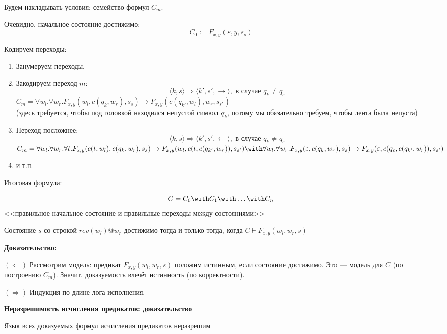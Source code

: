 Будем накладывать условия: семейство формул $C_m$. 

Очевидно, начальное состояние достижимо:
$$C_0 := F_{x,y}(\varepsilon,y,s_s)$$

Кодируем переходы:

\begin{enumerate}
\item Занумеруем переходы.

\item Закодируем переход $m$: $$\langle k, s \rangle \Rightarrow \langle k', s', \rightarrow \rangle, \text{ в случае } q_k \ne q_\varepsilon$$
$C_m = \forall w_l.\forall w_r.F_{x,y}(w_l,c(q_k,w_r),s_s) \rightarrow F_{x,y}(c(q_{k'},w_l),w_r,s_{s'})$\\
(здесь требуется, чтобы под головкой находился непустой символ $q_k$, потому мы обязательно требуем, чтобы лента была
непуста)

\item Переход посложнее:
$$\langle k, s \rangle \Rightarrow \langle k', s', \leftarrow \rangle, \text{ в случае } q_k \ne q_\varepsilon$$
$C_m = \forall w_l.\forall w_r.\forall t.F_{x,y}(c(t,w_l),c(q_k,w_r),s_s) \rightarrow F_{x,y}(w_l,c(t,c(q_{k'},w_r)),s_{s'}) \with
\forall w_l.\forall w_r.F_{x,y}(\varepsilon,c(q_k,w_r),s_s) \rightarrow F_{x,y}(\varepsilon,c(q_\varepsilon,c(q_{k'},w_r)),s_{s'})$

\item и т.п.
\end{enumerate}

Итоговая формула:

$$C = C_0 \with C_1 \with \dots \with C_n$$
<<правильное начальное состояние и правильные переходы между состояниями>>


Состояние $s$ со строкой $rev(w_l)@w_r$ достижимо тогда и только тогда, когда
$C \vdash F_{x,y}(w_l,w_r,s)$

\textbf{Доказательство:}

$(\Leftarrow)$ Рассмотрим модель: предикат $F_{x,y}(w_l,w_r,s)$ положим истинным, если состояние достижимо. 
Это --- модель для $C$ (по построению $C_m$). 
Значит, доказуемость влечёт истинность (по корректности). 

$(\Rightarrow)$ Индукция по длине лога исполнения.

\textbf{Неразрешимость исчисления предикатов: доказательство}

 Язык всех доказуемых формул исчисления предикатов неразрешим

